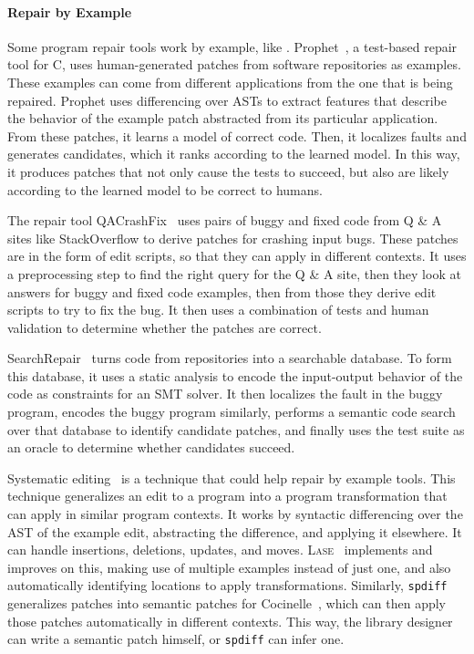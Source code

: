 \paragraph{Repair by Example}
Some program repair tools work by example, like \sysnamelong.
Prophet~\cite{Long:2016:APG:2837614.2837617}, a test-based repair tool for C,
uses human-generated patches from software repositories as examples.
These examples can come from different applications from the one that is being repaired.
Prophet uses differencing over ASTs %
to extract features that describe the behavior of the example patch abstracted from its particular application.
From these patches, it learns a model of correct code. Then,
it localizes faults and generates candidates, which it ranks according to the learned model.
In this way, it produces patches that not only cause the tests to succeed, but also
are likely according to the learned model to be correct to humans.

The repair tool QACrashFix~\cite{gao2015fixing} uses pairs of buggy and fixed code from Q \& A sites like
StackOverflow to derive patches for crashing input bugs. These patches are in the form of edit scripts,
so that they can apply in different contexts. %
It uses a preprocessing step to find the right query for the Q \& A site, then they
look at answers for buggy and fixed code examples, then from those they derive edit scripts to try to fix the bug.
It then uses a combination of tests and human validation to determine whether the patches are correct.

SearchRepair~\cite{Ke:2015:RPS:2916135.2916260} turns code from repositories into a searchable database.
To form this database, it uses a static analysis to encode the input-output behavior of the code as constraints for an SMT solver.
It then localizes the fault in the buggy program,
encodes the buggy program similarly, performs a semantic code search over that database to identify candidate patches,
and finally uses the test suite as an oracle to determine whether candidates succeed.

Systematic editing~\cite{meng2011systematic} is a technique that could help repair by example tools.
This technique generalizes an edit to a program into a program transformation that can apply in similar program contexts.
It works by syntactic differencing over the AST of the example edit, abstracting the difference, and applying it elsewhere.
It can handle insertions, deletions, updates, and moves.
\textsc{Lase}~\cite{meng2013lase} implements and improves on this,
making use of multiple examples instead of just one, %
and also automatically identifying locations to apply transformations.
Similarly, \lstinline{spdiff}~\cite{andersen2010generic} generalizes patches into semantic patches for Cocinelle~\cite{padioleau2008documenting},
which can then apply those patches automatically in different contexts. This way, the library designer can write a semantic patch
himself, or \lstinline{spdiff} can infer one.

